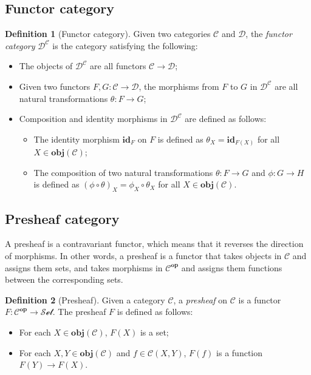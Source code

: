 \documentclass[12pt,a4paper]{report}
\theoremstyle{definition}
\newtheorem{definition}{Definition}[chapter]
\begin{document}
        \subsection{Functor category}
        \begin{definition}[Functor category]
            Given two categories $\mathcal{C}$ and $\mathcal{D}$, the \emph{functor category} $\mathcal{D}^{\mathcal{C}}$ is the category satisfying the following:
            \begin{itemize}
                \item 
                    The objects of $\mathcal{D}^{\mathcal{C}}$ are all functors $\mathcal{C} \to \mathcal{D}$;
                \item 
                    Given two functors $F,G: \mathcal{C} \to \mathcal{D}$, the morphisms from $F$ to $G$ in $\mathcal{D}^{\mathcal{C}}$ are all natural transformations $\theta : F \to G$;
                \item
                    Composition and identity morphisms in $\mathcal{D}^{\mathcal{C}}$ are defined as follows:
                    \begin{itemize}
                        \item 
                            The identity morphism $\textbf{id}_F$ on $F$ is defined as $\theta_X = \textbf{id}_{F(X)}$ for all $X \in \textbf{obj}(\mathcal{C})$;
                        \item
                            The composition of two natural transformations $\theta : F \to G$ and $\phi : G \to H$ is defined as $(\phi \circ \theta)_X = \phi_X \circ \theta_X$ for all $X \in \textbf{obj}(\mathcal{C})$.
                    \end{itemize}
            \end{itemize}
        \end{definition}

        \subsection{Presheaf category}
        A presheaf is a contravariant functor, which means that it reverses the direction of morphisms. In other words, a presheaf is a functor that takes objects in $\mathcal{C}$ and assigns them sets, and takes morphisms in $\mathcal{C}^{\textbf{op}}$ and assigns them functions between the corresponding sets.
        \begin{definition}[Presheaf]
            Given a category $\mathcal{C}$, a \emph{presheaf} on $\mathcal{C}$ is a functor $F: \mathcal{C}^{\textbf{op}} \to \mathcal{Set}$.
            The presheaf $F$ is defined as follows:
            \begin{itemize}
                \item 
                    For each $X \in \textbf{obj}(\mathcal{C})$, $F(X)$ is a set;
                \item
                    For each $X, Y \in \textbf{obj}(\mathcal{C})$ and $f \in \mathcal{C}{(X,Y)}$, $F(f)$ is a function $F(Y) \to F(X)$.
            \end{itemize}
        \end{definition}
\end{document}
